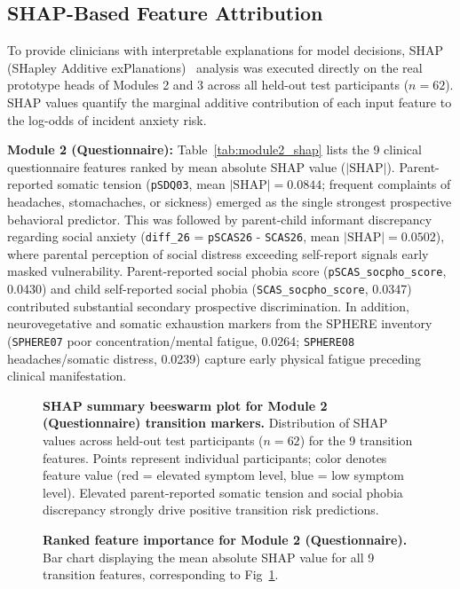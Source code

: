 \documentclass[10pt,letterpaper]{article}
\begin{document}
\subsection*{SHAP-Based Feature Attribution}

To provide clinicians with interpretable explanations for model decisions, SHAP (SHapley Additive exPlanations)~\cite{ref_shap} analysis was executed directly on the real prototype heads of Modules 2 and 3 across all held-out test participants ($n=62$). SHAP values quantify the marginal additive contribution of each input feature to the log-odds of incident anxiety risk.

\textbf{Module 2 (Questionnaire):} Table~\ref{tab:module2_shap} lists the 9 clinical questionnaire features ranked by mean absolute SHAP value ($|\mathrm{SHAP}|$). Parent-reported somatic tension (\texttt{pSDQ03}, mean $|\mathrm{SHAP}| = 0.0844$; frequent complaints of headaches, stomachaches, or sickness) emerged as the single strongest prospective behavioral predictor. This was followed by parent-child informant discrepancy regarding social anxiety (\texttt{diff\_26} = \texttt{pSCAS26} - \texttt{SCAS26}, mean $|\mathrm{SHAP}| = 0.0502$), where parental perception of social distress exceeding self-report signals early masked vulnerability. Parent-reported social phobia score (\texttt{pSCAS\_socpho\_score}, 0.0430) and child self-reported social phobia (\texttt{SCAS\_socpho\_score}, 0.0347) contributed substantial secondary prospective discrimination. In addition, neurovegetative and somatic exhaustion markers from the SPHERE inventory (\texttt{SPHERE07} poor concentration/mental fatigue, 0.0264; \texttt{SPHERE08} headaches/somatic distress, 0.0239) capture early physical fatigue preceding clinical manifestation.

\begin{figure}[!h]
\caption{\textbf{SHAP summary beeswarm plot for Module 2 (Questionnaire) transition markers.}
Distribution of SHAP values across held-out test participants ($n=62$) for the 9 transition features. Points represent individual participants; color denotes feature value (red = elevated symptom level, blue = low symptom level). Elevated parent-reported somatic tension and social phobia discrepancy strongly drive positive transition risk predictions.}
\label{fig:module2_shap_summary}
\end{figure}

\begin{figure}[!h]
\caption{\textbf{Ranked feature importance for Module 2 (Questionnaire).}
Bar chart displaying the mean absolute SHAP value for all 9 transition features, corresponding to Fig~\ref{fig:module2_shap_summary}.}
\label{fig:module2_bar}
\end{figure}
\end{document}
